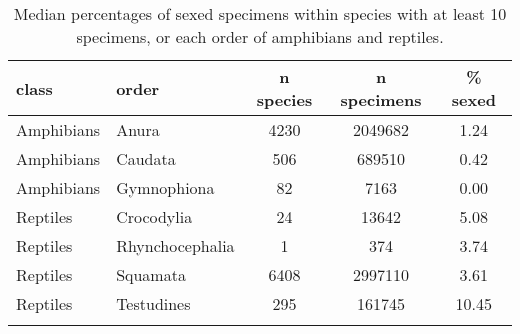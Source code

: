 \begin{longtable}{llccc}
\caption{Median percentages of sexed specimens within species with at least 
                   10 specimens, or each order of amphibians and reptiles.} \\ 
  \hline
class & order & n species & n specimens & \% sexed \\ 
  \hline
Amphibians & Anura & 4230 & 2049682 & 1.24 \\ 
  Amphibians & Caudata & 506 & 689510 & 0.42 \\ 
  Amphibians & Gymnophiona &  82 & 7163 & 0.00 \\ 
  Reptiles & Crocodylia &  24 & 13642 & 5.08 \\ 
  Reptiles & Rhynchocephalia &   1 & 374 & 3.74 \\ 
  Reptiles & Squamata & 6408 & 2997110 & 3.61 \\ 
  Reptiles & Testudines & 295 & 161745 & 10.45 \\ 
   \hline
\hline
\label{table-orders}
\end{longtable}

